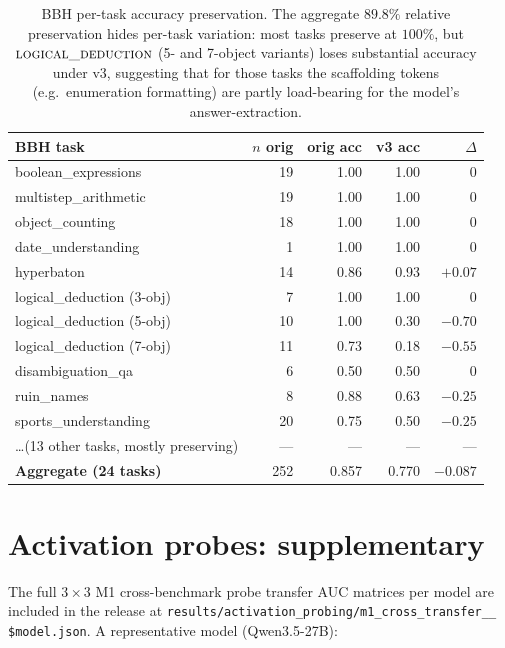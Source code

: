 \documentclass[11pt]{article}
\newcommand{\bench}[1]{\textsc{#1}}
\begin{document}
\begin{table}[h]
\centering\small
\setlength{\tabcolsep}{3pt}
\begin{tabular}{lrrrr}
\toprule
BBH task & $n$ orig & orig acc & v3 acc & $\Delta$ \\
\midrule
boolean\_expressions & 19 & 1.00 & 1.00 & 0 \\
multistep\_arithmetic & 19 & 1.00 & 1.00 & 0 \\
object\_counting & 18 & 1.00 & 1.00 & 0 \\
date\_understanding & 1 & 1.00 & 1.00 & 0 \\
hyperbaton & 14 & 0.86 & 0.93 & $+0.07$ \\
logical\_deduction (3-obj) & 7 & 1.00 & 1.00 & 0 \\
logical\_deduction (5-obj) & 10 & 1.00 & 0.30 & $-0.70$ \\
logical\_deduction (7-obj) & 11 & 0.73 & 0.18 & $-0.55$ \\
disambiguation\_qa & 6 & 0.50 & 0.50 & 0 \\
ruin\_names & 8 & 0.88 & 0.63 & $-0.25$ \\
sports\_understanding & 20 & 0.75 & 0.50 & $-0.25$ \\
\dots (13 other tasks, mostly preserving) & --- & --- & --- & --- \\
\midrule
\textbf{Aggregate (24 tasks)} & 252 & 0.857 & 0.770 & $-0.087$ \\
\bottomrule
\end{tabular}
\caption{BBH per-task accuracy preservation. The aggregate $89.8\%$
relative preservation hides per-task variation: most tasks preserve at
$100\%$, but $\bench{logical\_deduction}$ (5- and 7-object variants) loses
substantial accuracy under v3, suggesting that for those tasks the
scaffolding tokens (e.g.\ enumeration formatting) are partly load-bearing
for the model's answer-extraction.}
\label{tab:bbh-pertask}
\end{table}

\section{Activation probes: supplementary}
\label{app:probes-supplementary}

The full $3\times 3$ M1 cross-benchmark probe transfer AUC matrices per
model are included in the release at
\texttt{results/activation\_probing/m1\_cross\_transfer\_\_\\\$model.json}.
A representative model (Qwen3.5-27B):
\end{document}
